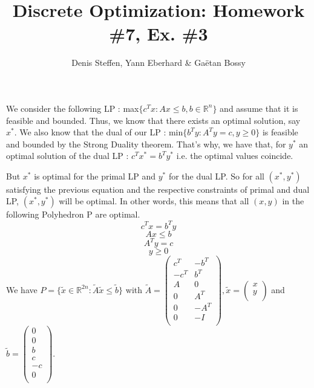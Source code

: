 \documentclass[a4paper,11pt,french]{article}
\title{Discrete Optimization: Homework \#7, Ex. \#3}
\author{Denis Steffen, Yann Eberhard \& Gaëtan Bossy}
\begin{document}
    
    \maketitle
   We consider the following LP :  max$\{ c^Tx : Ax \leq b, b\in \mathbb{R}^n \} $ and assume that it is feasible and bounded. Thus, we know that there exists an optimal solution, say $x^*$. 
   We also know that the dual of our LP : min$ \{ b^Ty : A^Ty = c, y \geq 0 \} $ is feasible and bounded by the Strong Duality theorem. That's why, we have that, for $y^*$ an optimal solution of the dual LP : 
   $c^Tx^* = b^Ty^*$ i.e. the optimal values coincide. 

   But $x^*$ is optimal for the primal LP and $y^*$ for the dual LP. So for all $(x^*, y^*)$ satisfying the previous equation and the respective constraints of primal and dual LP, $(x^*, y^*)$ will be optimal. 
   In other words, this means that all $(x, y)$ in the following Polyhedron P are optimal.
\begin{displaymath}
     c^Tx = b^Ty
    \end{displaymath} 
    \begin{displaymath}
       Ax \leq b
     \end{displaymath}
     \begin{displaymath}
      A^Ty = c
    \end{displaymath}
    \begin{displaymath}
      y \geq 0
    \end{displaymath}
    We have $ P = \{ \tilde{x} \in \mathbb{R}^{2n} : \tilde{A} \tilde{x} \leq \tilde{b} \} $ with $\tilde{A} =  \begin{pmatrix}
       c^T & -b^T\\
      -c^T & b^T\\
      A & 0\\
      0 & A^T\\
      0 & -A^T\\
      0 & -I\\
    \end{pmatrix},
      \tilde{x} = 
    \left(\begin{array}{c}
      x\\
      y\\
    \end{array} \right)$ and $ \tilde{b} = \left( \begin{array}{c} 
    0\\
    0\\
    b\\
    c\\
    -c\\ 
    0\\
    \end{array} 
    \right).$ 
\end{document}

